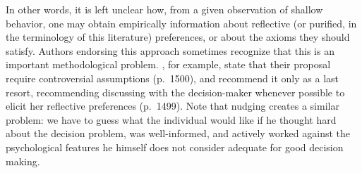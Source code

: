 \documentclass[version=last, pagesize, twoside=off, bibliography=totoc, DIV=calc, fontsize=12pt, a4paper, french, english]{scrartcl}
\begin{document}
In other words, it is left unclear how, from a given observation of shallow behavior, one may obtain empirically information about reflective (or purified, in the terminology of this literature) preferences, or about the axioms they should satisfy. Authors endorsing this approach sometimes recognize that this is an important methodological problem. , for example, state that their proposal require controversial assumptions (p.\ 1500), and recommend it only as a last resort, recommending discussing with the decision-maker whenever possible to elicit her reflective preferences (p.\ 1499). Note that nudging \citep{thaler_nudge_2009} creates a similar problem: we have to guess what the individual would like if he thought hard about the decision problem, was well-informed, and actively worked against the psychological features he himself does not consider adequate for good decision making.
\end{document}
